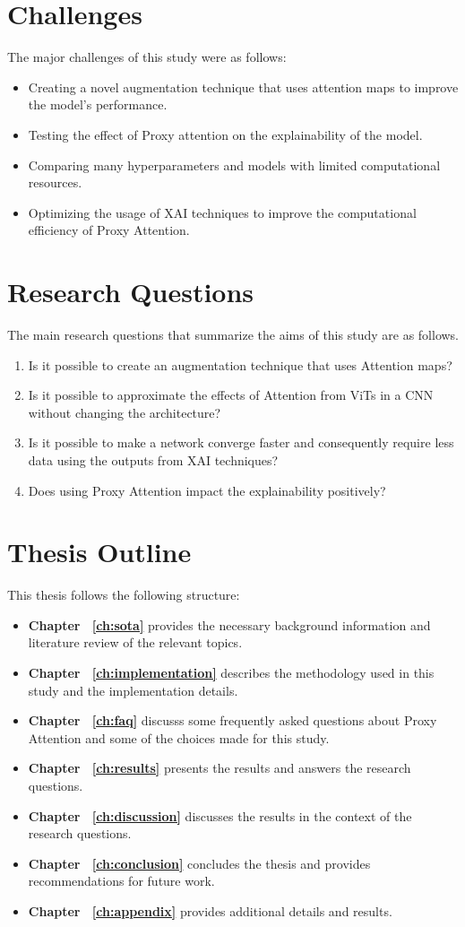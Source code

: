 \section{Challenges}
The major challenges of this study were as follows:
\begin{itemize}
    \item Creating a novel augmentation technique that uses attention maps to improve the model's performance.
    \item Testing the effect of Proxy attention on the explainability of the model.
    \item Comparing many hyperparameters and models with limited computational resources.
    \item Optimizing the usage of XAI techniques to improve the computational efficiency of Proxy Attention.
\end{itemize}

\section{Research Questions} \label{section:researchq}
The main research questions that summarize the aims of this study are as follows.
\begin{enumerate}
    \item Is it possible to create an augmentation technique that uses Attention maps?
    \item Is it possible to approximate the effects of Attention from ViTs in a CNN without changing the architecture?
    \item Is it possible to make a network converge faster and consequently require less data using the outputs from XAI techniques?
    \item Does using Proxy Attention impact the explainability positively?
\end{enumerate}
\section{Thesis Outline}
This thesis follows the following structure:
\begin{itemize}
    \item \textbf{Chapter ~\ref{ch:sota}} provides the necessary background information and literature review of the relevant topics.
    \item \textbf{Chapter ~\ref{ch:implementation}} describes the methodology used in this study and the implementation details.
    \item \textbf{Chapter ~\ref{ch:faq}} discusss some frequently asked questions about Proxy Attention and some of the choices made for this study.
    \item \textbf{Chapter ~\ref{ch:results}} presents the results and answers the research questions.
    \item \textbf{Chapter ~\ref{ch:discussion}} discusses the results in the context of the research questions.
    \item \textbf{Chapter ~\ref{ch:conclusion}} concludes the thesis and provides recommendations for future work.
    \item \textbf{Chapter ~\ref{ch:appendix}} provides additional details and results.
\end{itemize}